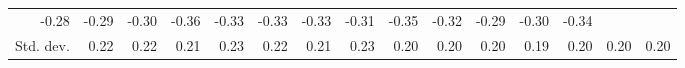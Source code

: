 \begin{tabular}{lllllllllllllll}
  \multicolumn{1}{r}{-0.28} &
  \multicolumn{1}{r}{-0.29} &
  \multicolumn{1}{r}{-0.30} &
  \multicolumn{1}{r}{-0.36} &
  \multicolumn{1}{r}{-0.33} &
  \multicolumn{1}{r}{-0.33} &
  \multicolumn{1}{r}{-0.33} &
  \multicolumn{1}{r}{-0.31} &
  \multicolumn{1}{r}{-0.35} &
  \multicolumn{1}{r}{-0.32} &
  \multicolumn{1}{r}{-0.29} &
  \multicolumn{1}{r}{-0.30} &
  \multicolumn{1}{r}{-0.34} \\
\multicolumn{1}{l}{\hspace{2em}Std. dev.} &
  \multicolumn{1}{|r}{0.22} &
  \multicolumn{1}{r}{0.22} &
  \multicolumn{1}{r}{0.21} &
  \multicolumn{1}{r}{0.23} &
  \multicolumn{1}{r}{0.22} &
  \multicolumn{1}{r}{0.21} &
  \multicolumn{1}{r}{0.23} &
  \multicolumn{1}{r}{0.20} &
  \multicolumn{1}{r}{0.20} &
  \multicolumn{1}{r}{0.20} &
  \multicolumn{1}{r}{0.19} &
  \multicolumn{1}{r}{0.20} &
  \multicolumn{1}{r}{0.20} &
  \multicolumn{1}{r}{0.20} \\
\cline{1-15}
\end{tabular}
